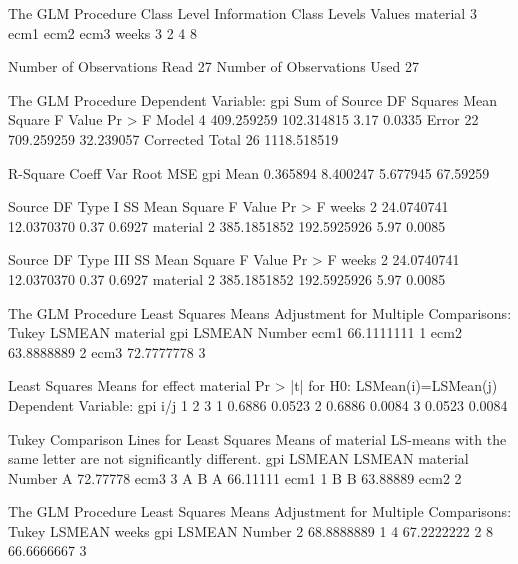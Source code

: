 \documentclass{article}
\begin{document}
\begin{Woutput}
The GLM Procedure
        Class Level Information
Class         Levels    Values
material           3    ecm1 ecm2 ecm3
weeks              3    2 4 8

Number of Observations Read          27
Number of Observations Used          27

The GLM Procedure
Dependent Variable: gpi
                                        Sum of
Source                      DF         Squares     Mean Square    F Value    Pr > F
Model                        4      409.259259      102.314815       3.17    0.0335
Error                       22      709.259259       32.239057
Corrected Total             26     1118.518519

R-Square     Coeff Var      Root MSE      gpi Mean
0.365894      8.400247      5.677945      67.59259

Source                      DF       Type I SS     Mean Square    F Value    Pr > F
weeks                        2      24.0740741      12.0370370       0.37    0.6927
material                     2     385.1851852     192.5925926       5.97    0.0085

Source                      DF     Type III SS     Mean Square    F Value    Pr > F
weeks                        2      24.0740741      12.0370370       0.37    0.6927
material                     2     385.1851852     192.5925926       5.97    0.0085

The GLM Procedure
Least Squares Means
Adjustment for Multiple Comparisons: Tukey
                              LSMEAN
material      gpi LSMEAN      Number
ecm1          66.1111111           1
ecm2          63.8888889           2
ecm3          72.7777778           3

   Least Squares Means for effect material
     Pr > |t| for H0: LSMean(i)=LSMean(j)
           Dependent Variable: gpi
i/j              1             2             3
   1                      0.6886        0.0523
   2        0.6886                      0.0084
   3        0.0523        0.0084

Tukey Comparison Lines for Least Squares Means of material
LS-means with the same letter are not significantly different.
                gpi                LSMEAN
             LSMEAN    material    Number
     A     72.77778    ecm3             3
     A
B    A     66.11111    ecm1             1
B
B          63.88889    ecm2             2

The GLM Procedure
Least Squares Means
Adjustment for Multiple Comparisons: Tukey
                           LSMEAN
weeks      gpi LSMEAN      Number
2          68.8888889           1
4          67.2222222           2
8          66.6666667           3


\end{Woutput}
\end{document}
